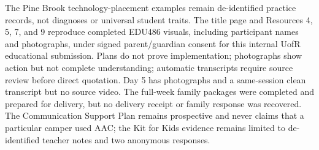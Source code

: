 \documentclass[11pt]{article}
\newcommand{\toolsection}[1]{%
  \Needspace{4\baselineskip}
  \vspace{0.065in}\noindent{\normalsize\bfseries\color{PrimaryRed}#1}
  \par\vspace{0.02in}
}
\begin{document}
\toolsection{Evidence Boundary}

The Pine Brook technology-placement examples remain de-identified practice records, not diagnoses or universal student traits. The title page and Resources 4, 5, 7, and 9 reproduce completed EDU486 visuals, including participant names and photographs, under signed parent/guardian consent for this internal UofR educational submission. Plans do not prove implementation; photographs show action but not complete understanding; automatic transcripts require source review before direct quotation. Day 5 has photographs and a same-session clean transcript but no source video. The full-week family packages were completed and prepared for delivery, but no delivery receipt or family response was recovered. The Communication Support Plan remains prospective and never claims that a particular camper used AAC; the Kit for Kids evidence remains limited to de-identified teacher notes and two anonymous responses.

\clearpage
\tableofcontents
\end{document}
